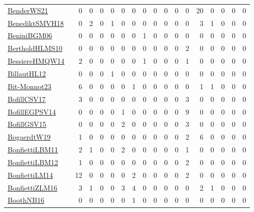 {\begin{longtable}{l*{16}{r}}
\href{papers/BenderWS21.pdf}{BenderWS21}~\cite{BenderWS21} & 0 & 0 & 0 & 0 & 0 & 0 & 0 & 0 & 0 & 0 & 0 & 20 & 0 & 0 & 0 & 0\\
\href{papers/BenediktSMVH18.pdf}{BenediktSMVH18}~\cite{BenediktSMVH18} & 0 & 2 & 0 & 1 & 0 & 0 & 0 & 0 & 0 & 0 & 0 & 3 & 1 & 0 & 0 & 0\\
\href{papers/BeniniBGM06.pdf}{BeniniBGM06}~\cite{BeniniBGM06} & 0 & 0 & 0 & 0 & 0 & 0 & 1 & 0 & 0 & 0 & 0 & 0 & 0 & 0 & 0 & 0\\
\href{papers/BertholdHLMS10.pdf}{BertholdHLMS10}~\cite{BertholdHLMS10} & 0 & 0 & 0 & 0 & 0 & 0 & 0 & 0 & 0 & 0 & 2 & 0 & 0 & 0 & 0 & 0\\
\href{papers/BessiereHMQW14.pdf}{BessiereHMQW14}~\cite{BessiereHMQW14} & 2 & 0 & 0 & 0 & 0 & 0 & 1 & 0 & 0 & 0 & 1 & 0 & 0 & 0 & 0 & 0\\
\href{papers/BillautHL12.pdf}{BillautHL12}~\cite{BillautHL12} & 0 & 0 & 0 & 1 & 0 & 0 & 0 & 0 & 0 & 0 & 0 & 0 & 0 & 0 & 0 & 0\\
\href{papers/Bit-Monnot23.pdf}{Bit-Monnot23}~\cite{Bit-Monnot23} & 6 & 0 & 0 & 0 & 0 & 1 & 0 & 0 & 0 & 0 & 0 & 1 & 1 & 0 & 0 & 0\\
\href{papers/BofillCSV17.pdf}{BofillCSV17}~\cite{BofillCSV17} & 3 & 0 & 0 & 0 & 0 & 0 & 0 & 0 & 0 & 0 & 3 & 0 & 0 & 0 & 0 & 0\\
\href{papers/BofillEGPSV14.pdf}{BofillEGPSV14}~\cite{BofillEGPSV14} & 0 & 0 & 0 & 0 & 1 & 0 & 0 & 0 & 0 & 0 & 9 & 0 & 0 & 0 & 0 & 0\\
\href{papers/BofillGSV15.pdf}{BofillGSV15}~\cite{BofillGSV15} & 0 & 0 & 0 & 0 & 2 & 0 & 0 & 0 & 0 & 0 & 3 & 0 & 0 & 0 & 0 & 0\\
\href{papers/BogaerdtW19.pdf}{BogaerdtW19}~\cite{BogaerdtW19} & 1 & 0 & 0 & 0 & 0 & 0 & 0 & 0 & 0 & 0 & 2 & 6 & 0 & 0 & 0 & 0\\
\href{papers/BonfiettiLBM11.pdf}{BonfiettiLBM11}~\cite{BonfiettiLBM11} & 2 & 1 & 0 & 0 & 2 & 0 & 0 & 0 & 0 & 0 & 1 & 0 & 0 & 0 & 0 & 0\\
\href{papers/BonfiettiLBM12.pdf}{BonfiettiLBM12}~\cite{BonfiettiLBM12} & 1 & 0 & 0 & 0 & 0 & 0 & 0 & 0 & 0 & 0 & 2 & 0 & 0 & 0 & 0 & 0\\
\href{papers/BonfiettiLM14.pdf}{BonfiettiLM14}~\cite{BonfiettiLM14} & 12 & 0 & 0 & 0 & 0 & 2 & 0 & 0 & 0 & 0 & 2 & 0 & 0 & 0 & 0 & 0\\
\href{papers/BonfiettiZLM16.pdf}{BonfiettiZLM16}~\cite{BonfiettiZLM16} & 3 & 1 & 0 & 0 & 3 & 4 & 0 & 0 & 0 & 0 & 0 & 2 & 1 & 0 & 0 & 0\\
\href{papers/BoothNB16.pdf}{BoothNB16}~\cite{BoothNB16} & 0 & 0 & 0 & 0 & 0 & 1 & 0 & 0 & 0 & 0 & 0 & 0 & 0 & 0 & 0 & 0\\

\end{longtable}}

